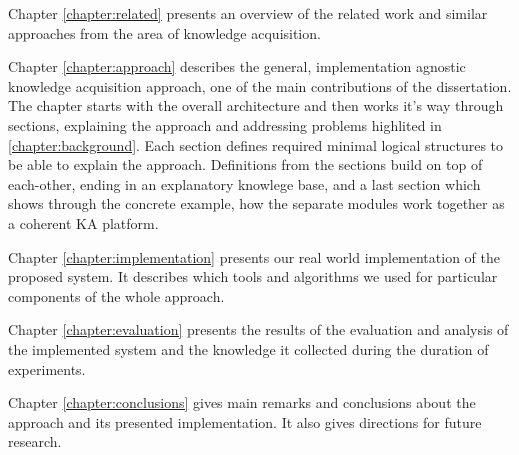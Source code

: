 Chapter \ref{chapter:related} presents an overview of the related work and
similar approaches from the area of knowledge acquisition.

Chapter \ref{chapter:approach} describes the general, implementation agnostic
knowledge acquisition approach, one of the main contributions of the dissertation.
The chapter starts with the overall architecture and then works it's way through
sections, explaining the approach and addressing problems highlited in
\autoref{chapter:background}. Each section defines required minimal logical
structures to be able to explain the approach. Definitions from the sections
build on top of each-other, ending in an explanatory knowlege base, and
a last section which shows through the concrete example, how the separate 
modules work together as a coherent KA platform.

Chapter \ref{chapter:implementation} presents our real world implementation of 
the proposed system. It describes which tools and algorithms we used for 
particular components of the whole approach.

Chapter \ref{chapter:evaluation} presents the results of the evaluation and
analysis of the implemented system and the knowledge it collected during the
duration of experiments.

Chapter \ref{chapter:conclusions} gives main remarks and conclusions about the
approach and its presented implementation. It also gives directions for future
research.
